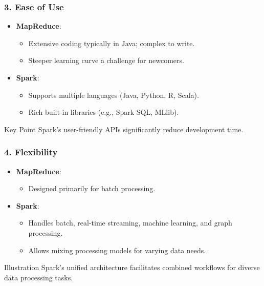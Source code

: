 \documentclass[aspectratio=169]{beamer}
\begin{document}
\begin{frame}[fragile]
    \frametitle{3. Ease of Use}
    \begin{itemize}
        \item \textbf{MapReduce}:
            \begin{itemize}
                \item Extensive coding typically in Java; complex to write.
                \item Steeper learning curve a challenge for newcomers.
            \end{itemize}
        \item \textbf{Spark}:
            \begin{itemize}
                \item Supports multiple languages (Java, Python, R, Scala).
                \item Rich built-in libraries (e.g., Spark SQL, MLlib).
            \end{itemize}
    \end{itemize}
    \begin{block}{Key Point}
        Spark's user-friendly APIs significantly reduce development time.
    \end{block}
\end{frame}

\begin{frame}[fragile]
    \frametitle{4. Flexibility}
    \begin{itemize}
        \item \textbf{MapReduce}:
            \begin{itemize}
                \item Designed primarily for batch processing.
            \end{itemize}
        \item \textbf{Spark}:
            \begin{itemize}
                \item Handles batch, real-time streaming, machine learning, and graph processing.
                \item Allows mixing processing models for varying data needs.
            \end{itemize}
    \end{itemize}
    \begin{block}{Illustration}
        Spark's unified architecture facilitates combined workflows for diverse data processing tasks.
    \end{block}
\end{frame}
\end{document}
